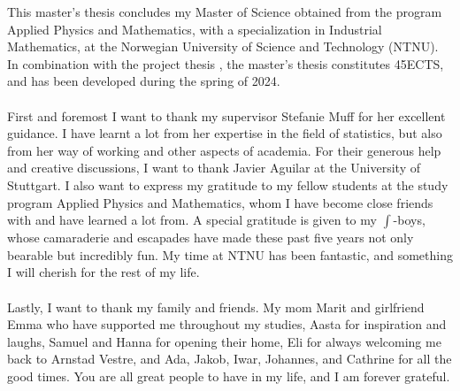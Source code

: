 This master's thesis concludes my Master of Science obtained from the program Applied Physics and Mathematics, with a specialization in Industrial Mathematics, at the Norwegian University of Science and Technology (NTNU). In combination with the project thesis \citep{Arnstad:Relative_variable_importance_in_Bayesian_linear_mixed_models:2024}, the master's thesis constitutes 45ECTS, and has been developed during the spring of 2024.
\\
\\
First and foremost I want to thank my supervisor Stefanie Muff for her excellent guidance. I have learnt a lot from her expertise in the field of statistics, but also from her way of working and other aspects of academia. For their generous help and creative discussions, I want to thank Javier Aguilar at the University of Stuttgart. I also want to express my gratitude to my fellow students at the study program Applied Physics and Mathematics, whom I have become close friends with and have learned a lot from. A special gratitude is given to my $\int$-boys, whose camaraderie and escapades have made these past five years not only bearable but incredibly fun. My time at NTNU has been fantastic, and something I will cherish for the rest of my life. 
\\
\\
Lastly, I want to thank my family and friends. My mom Marit and girlfriend Emma who have supported me throughout my studies, Aasta for inspiration and laughs, Samuel and Hanna for opening their home, Eli for always welcoming me back to Arnstad Vestre, and Ada, Jakob, Iwar, Johannes, and Cathrine for all the good times. You are all great people to have in my life, and I am forever grateful. 

